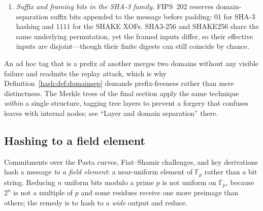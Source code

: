 \documentclass[11pt,a4paper]{article}
\theoremstyle{definition}
\theoremstyle{remark}
\newcommand{\Fp}{\ensuremath{\mathbb{F}_{p}}}
\begin{document}
\begin{enumerate}
  tag and Proposition~\ref{hash:prop:domainsep} makes the resulting
  domains independent; a concrete BLAKE2b instantiation does not make
  that independence a fact ``by construction''. The deployed
  personalisations include \texttt{Zcash\_\allowbreak ExpandSeed} for
  key expansion (protocol specification \href{https://zips.z.cash/protocol/protocol.pdf\#concreteprfs}{\S~5.4.2}),
  \texttt{Zcash\_\allowbreak OrchardKDF} for the note-encryption
  key-derivation function (KDF, the object of
  \S\ref{symmetric:subsec:kdf}; protocol specification \href{https://zips.z.cash/protocol/protocol.pdf\#concreteorchardkdf}{\S~5.4.5.6}), and
  \texttt{Zcash\_\allowbreak Orchardock} for the outgoing cipher key
  (protocol specification \href{https://zips.z.cash/protocol/protocol.pdf\#concreteprfs}{\S~5.4.2})---all exactly \(16\) bytes.
\item \emph{Suffix and framing bits in the SHA-3 family.} FIPS~202
  reserves domain-separation suffix bits appended to the message
  before padding: \(01\) for SHA-3 hashing and \(1111\) for the SHAKE
  XOFs. SHA3-256 and SHAKE256 share the same underlying permutation,
  yet the framed inputs differ, so their effective inputs are
  disjoint---though their finite digests can still coincide by
  chance.
\end{enumerate}

An ad hoc tag that is a prefix of another merges two domains without
any visible failure and readmits the replay attack, which is why
Definition~\ref{hash:def:domainsep} demands prefix-freeness rather
than mere distinctness. The Merkle trees of the final section apply
the same technique \emph{within} a single structure, tagging tree
layers to prevent a forgery that confuses leaves with internal nodes;
see ``Layer and domain separation'' there.

\subsection{Hashing to a field element}\label{hash:subsec:hashtofield}

Commitments over the Pasta curves, Fiat--Shamir challenges, and key
derivations hash a message \emph{to a field element}: a near-uniform
element of \(\Fp\) rather than a bit string. Reducing \(n\) uniform
bits modulo a prime \(p\) is not uniform on \(\Fp\), because \(2^{n}\)
is not a multiple of \(p\) and some residues receive one more preimage
than others; the remedy is to hash to a \emph{wide} output and reduce.
\end{document}

